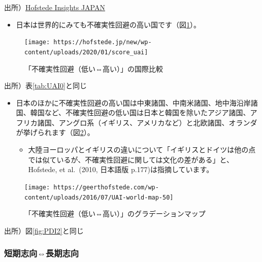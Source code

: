 \documentclass[
]{book}
\providecommand{\tightlist}{%
  \setlength{\itemsep}{0pt}\setlength{\parskip}{0pt}}
\begin{document}
出所）\href{https://hofstede.jp/6dimentionsmodel_uai/}{Hofstede Insights JAPAN}

\begin{itemize}
\tightlist
\item
  日本は世界的にみても不確実性回避の高い国です（図\ref{fig:UAI1}）。
\end{itemize}

\begin{figure}
\texttt{[image: https://hofstede.jp/new/wp-content/uploads/2020/01/score\_uai]} \caption{「不確実性回避（低い⇔高い）」の国際比較}\label{fig:UAI1}
\end{figure}

出所）表\ref{tab:UAI0}と同じ

\begin{itemize}
\item
  日本のほかに不確実性回避の高い国は中東諸国、中南米諸国、地中海沿岸諸国、韓国など、不確実性回避の低い国は日本と韓国を除いたアジア諸国、アフリカ諸国、アングロ系（イギリス、アメリカなど）と北欧諸国、オランダが挙げられます（図\ref{fig:UAI2}）。

  \begin{itemize}
  \tightlist
  \item
    大陸ヨーロッパとイギリスの違いについて「イギリスとドイツは他の点では似ているが、不確実性回避に関しては文化の差がある」と、Hofstede, et al.~(2010, 日本語版 p.177)は指摘しています。
  \end{itemize}
\end{itemize}

\begin{figure}
\texttt{[image: https://geerthofstede.com/wp-content/uploads/2016/07/UAI-world-map-50]} \caption{「不確実性回避（低い⇔高い）」のグラデーションマップ}\label{fig:UAI2}
\end{figure}

出所）図\ref{fig:PDI2}と同じ

\hypertarget{ux77edux671fux5fd7ux5411ux9577ux671fux5fd7ux5411}{%
\subsubsection{短期志向⇔長期志向}\label{ux77edux671fux5fd7ux5411ux9577ux671fux5fd7ux5411}}
\end{document}
